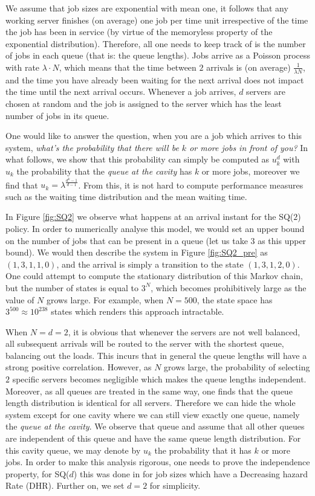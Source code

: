 \documentclass[12pt]{report}
\begin{document}
We assume that job sizes are exponential with mean one, it follows that any working server finishes (on average) one job per time unit irrespective of the time the job has been in service (by virtue of the memoryless property of the exponential distribution). Therefore, all one needs to keep track of is the number of jobs in each queue (that is: the queue lengths). Jobs arrive as a Poisson process with rate $\lambda \cdot N$, which means that the time between $2$ arrivals is (on average) $\frac{1}{\lambda N}$, and the time you have already been waiting for the next arrival does not impact the time until the next arrival occurs. Whenever a job arrives, $d$ servers are chosen at random and the job is assigned to the server which has the least number of jobs in its queue.

One would like to answer the question, when you are a job which arrives to this system, \textit{what's the probability that there will be $k$ or more jobs in front of you?} In what follows, we show that this probability can simply be computed as $u_k^d$ with $u_k$ the probability that the \textit{queue at the cavity} has $k$ or more jobs, moreover we find that $u_k=\lambda^{\frac{d^{k}-1}{d-1}}$. From this, it is not hard to compute performance measures such as the waiting time distribution and the mean waiting time.

In Figure \ref{fig:SQ2} we observe what happens at an arrival instant for the SQ($2$) policy. In order to numerically analyse this model, we would set an upper bound on the number of jobs that can be present in a queue (let us take $3$ as this upper bound). We would then describe the system in Figure \ref{fig:SQ2_pre} as $(1,3,1,1,0)$, and the arrival is simply a transition to the state $(1,3,1,2,0)$. One could attempt to compute the stationary distribution of this Markov chain, but the number of states is equal to $3^N$, which becomes prohibitively large as the value of $N$ grows large. For example, when $N=500$, the state space has $3^{500} \approx 10^{238}$ states which renders this approach intractable.

When $N=d=2$, it is obvious that whenever the servers are not well balanced, all subsequent arrivals will be routed to the server with the shortest queue, balancing out the loads. This incurs that in general the queue lengths will have a strong positive correlation. However, as $N$ grows large, the probability of selecting $2$ specific servers becomes negligible which makes the queue lengths independent. Moreover, as all queues are treated in the same way, one finds that the queue length distribution is identical for all servers. Therefore we can hide the whole system except for one cavity where we can still view exactly one queue, namely the \textit{queue at the cavity}. We observe that queue and assume that all other queues are independent of this queue and have the same queue length distribution. For this cavity queue, we may denote by $u_k$ the probability that it has $k$ or more jobs. In order to make this analysis rigorous, one needs to prove the independence property, for SQ($d$) this was done in \cite{bramson2012asymptotic} for job sizes which have a Decreasing hazard Rate (DHR). Further on, we set $d=2$ for simplicity.
\end{document}
